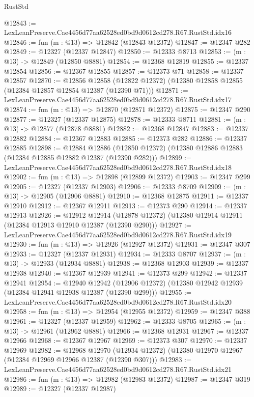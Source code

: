 \begin{lexlean}{RustStd}
\begin{coremodule}
@12843 := LexLeanPreserve.Cae4456d77aa62528ed0bd9d0612cd278.R67.RustStd.idx16
@12846 := fun (m : @13) => @12842 (@12843 @12372)
@12847 := @12347 @282
@12849 := @12327 (@12337 @12847)
@12850 := @12333 @8713
@12853 := (m : @13) -> @12849 (@12850 @8881)
@12854 := @12368 @12819
@12855 := @12337 @12854
@12856 := @12367 @12855
@12857 := @12373 @71
@12858 := @12337 @12857
@12870 := @12856
    @12858
    (@12822 @12372)
    (@12380 @12858 @12855 (@12384 @12857 @12854 @12387 (@12390 @71)))
@12871 := LexLeanPreserve.Cae4456d77aa62528ed0bd9d0612cd278.R67.RustStd.idx17
@12874 := fun (m : @13) => @12870 (@12871 @12372)
@12875 := @12347 @290
@12877 := @12327 (@12337 @12875)
@12878 := @12333 @8711
@12881 := (m : @13) -> @12877 (@12878 @8881)
@12882 := @12368 @12847
@12883 := @12337 @12882
@12884 := @12367 @12883
@12885 := @12373 @282
@12886 := @12337 @12885
@12898 := @12884
    @12886
    (@12850 @12372)
    (@12380 @12886 @12883 (@12384 @12885 @12882 @12387 (@12390 @282)))
@12899 := LexLeanPreserve.Cae4456d77aa62528ed0bd9d0612cd278.R67.RustStd.idx18
@12902 := fun (m : @13) => @12898 (@12899 @12372)
@12903 := @12347 @299
@12905 := @12327 (@12337 @12903)
@12906 := @12333 @8709
@12909 := (m : @13) -> @12905 (@12906 @8881)
@12910 := @12368 @12875
@12911 := @12337 @12910
@12912 := @12367 @12911
@12913 := @12373 @290
@12914 := @12337 @12913
@12926 := @12912
    @12914
    (@12878 @12372)
    (@12380 @12914 @12911 (@12384 @12913 @12910 @12387 (@12390 @290)))
@12927 := LexLeanPreserve.Cae4456d77aa62528ed0bd9d0612cd278.R67.RustStd.idx19
@12930 := fun (m : @13) => @12926 (@12927 @12372)
@12931 := @12347 @307
@12933 := @12327 (@12337 @12931)
@12934 := @12333 @8707
@12937 := (m : @13) -> @12933 (@12934 @8881)
@12938 := @12368 @12903
@12939 := @12337 @12938
@12940 := @12367 @12939
@12941 := @12373 @299
@12942 := @12337 @12941
@12954 := @12940
    @12942
    (@12906 @12372)
    (@12380 @12942 @12939 (@12384 @12941 @12938 @12387 (@12390 @299)))
@12955 := LexLeanPreserve.Cae4456d77aa62528ed0bd9d0612cd278.R67.RustStd.idx20
@12958 := fun (m : @13) => @12954 (@12955 @12372)
@12959 := @12347 @388
@12961 := @12327 (@12337 @12959)
@12962 := @12333 @8705
@12965 := (m : @13) -> @12961 (@12962 @8881)
@12966 := @12368 @12931
@12967 := @12337 @12966
@12968 := @12367 @12967
@12969 := @12373 @307
@12970 := @12337 @12969
@12982 := @12968
    @12970
    (@12934 @12372)
    (@12380 @12970 @12967 (@12384 @12969 @12966 @12387 (@12390 @307)))
@12983 := LexLeanPreserve.Cae4456d77aa62528ed0bd9d0612cd278.R67.RustStd.idx21
@12986 := fun (m : @13) => @12982 (@12983 @12372)
@12987 := @12347 @319
@12989 := @12327 (@12337 @12987)

\end{coremodule}
\end{lexlean}
